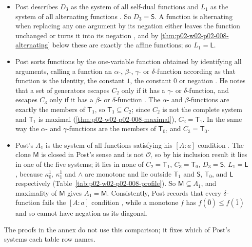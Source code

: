 \begin{itemize}
\item Post describes \(D_3\) as the system of all self-dual functions and
  \(L_1\) as the system of all alternating functions
  \cite[\S\,26, p.~106]{Post1941}.  So \(D_3=\mathsf S\).  A function is
  alternating when replacing any one argument by its negation either leaves
  the function unchanged or turns it into its negation
  \cite[\S\,15, p.~55]{Post1941}, and by
  \cref{thm:p02-w02-p02-008-alternating} below these are exactly the affine
  functions; so \(L_1=\mathsf L\).
\item Post sorts functions by the one-variable function obtained by
  identifying all arguments, calling a function an \(\alpha\)-,
  \(\beta\)-, \(\gamma\)- or \(\delta\)-function according as that function
  is the identity, the constant \(1\), the constant \(0\) or negation
  \cite[\S\,10, p.~43]{Post1941}.  He notes that a set of generators escapes
  \(C_2\) only if it has a \(\gamma\)- or \(\delta\)-function, and escapes
  \(C_3\) only if it has a \(\beta\)- or \(\delta\)-function
  \cite[\S\,26, p.~105]{Post1941}.  The \(\alpha\)- and
  \(\beta\)-functions are exactly the members of \(\mathsf T_1\), so
  \(\mathsf T_1\subseteq C_2\); since \(C_2\) is not the complete system and
  \(\mathsf T_1\) is maximal (\cref{thm:p02-w02-p02-008-maximal}),
  \(C_2=\mathsf T_1\).  In the same way the \(\alpha\)- and
  \(\gamma\)-functions are the members of \(\mathsf T_0\), and
  \(C_3=\mathsf T_0\).
\item Post's \(A_1\) is the system of all functions satisfying his
  \([A{:}a]\) condition \cite[\S\,26, p.~106]{Post1941}.  The clone
  \(\mathsf M\) is closed in Post's sense and is not \(\mathcal O\), so by
  his inclusion result it lies in one of the five systems; it lies in none of
  \(C_2=\mathsf T_1\), \(C_3=\mathsf T_0\), \(D_3=\mathsf S\),
  \(L_1=\mathsf L\), because \(\kappa^1_0\), \(\kappa^1_1\) and \(\land\)
  are monotone and lie outside \(\mathsf T_1\) and \(\mathsf S\),
  \(\mathsf T_0\), and \(\mathsf L\) respectively
  (Table~\ref{tab:p02-w02-p02-008-profile}).  So
  \(\mathsf M\subseteq A_1\), and maximality of \(\mathsf M\) gives
  \(A_1=\mathsf M\).  Consistently, Post records that every
  \(\delta\)-function fails the \([A{:}a]\) condition
  \cite[\S\,26, p.~106]{Post1941}, while a monotone \(f\) has
  \(f(\bar0)\leq f(\bar1)\) and so cannot have negation as its diagonal.
\end{itemize}
The proofs in the annex do not use this comparison; it fixes which of Post's
systems each table row names.

